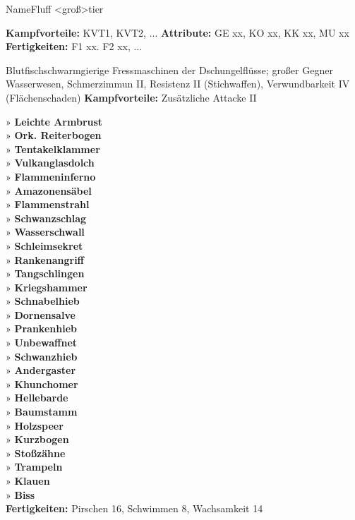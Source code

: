 \documentclass[linksbund,ATvorVT]{rpg-ilaris}
\begin{document}
\begin{multicols}{2}[
		\chapter*{} %
	]
\begin{gegner}{Name}{Fluff <groß>}{tier}
	{}
	{}%

	\textbf{Kampfvorteile:} KVT1, KVT2, ...
	\trennlinie
	\textbf{Attribute:} GE xx, KO xx, KK xx, MU xx \\
	\textbf{Fertigkeiten:} F1 xx. F2 xx, ...
\end{gegner}


\begin{gegner}{Blutfischschwarm}{gierige Fressmaschinen der Dschungelflüsse; großer Gegner}{}
	{
	}{Wasserwesen, Schmerzimmun II, Resistenz II (Stichwaffen), Verwundbarkeit IV (Flächenschaden)}
	\textbf{Kampfvorteile:} Zusätzliche Attacke II

» \textbf{Leichte Armbrust}\\
» \textbf{Ork. Reiterbogen}\\
» \textbf{Tentakelklammer}\\
» \textbf{Vulkanglasdolch}\\
» \textbf{Flammeninferno}\\
» \textbf{Amazonensäbel}\\
» \textbf{Flammenstrahl}\\
» \textbf{Schwanzschlag}\\
» \textbf{Wasserschwall}\\
» \textbf{Schleimsekret}\\
» \textbf{Rankenangriff}\\
» \textbf{Tangschlingen}\\
» \textbf{Kriegshammer}\\
» \textbf{Schnabelhieb}\\
» \textbf{Dornensalve}\\
» \textbf{Prankenhieb}\\
» \textbf{Unbewaffnet}\\
» \textbf{Schwanzhieb}\\
» \textbf{Andergaster}\\
» \textbf{Khunchomer}\\
» \textbf{Hellebarde}\\
» \textbf{Baumstamm}\\
» \textbf{Holzspeer}\\
» \textbf{Kurzbogen}\\
» \textbf{Stoßzähne}\\
» \textbf{Trampeln}\\
» \textbf{Klauen}\\
» \textbf{Biss}\\

\trennlinie
	\textbf{Fertigkeiten:} Pirschen 16, Schwimmen 8, Wachsamkeit 14
\end{gegner}






\end{multicols}
\end{document}
